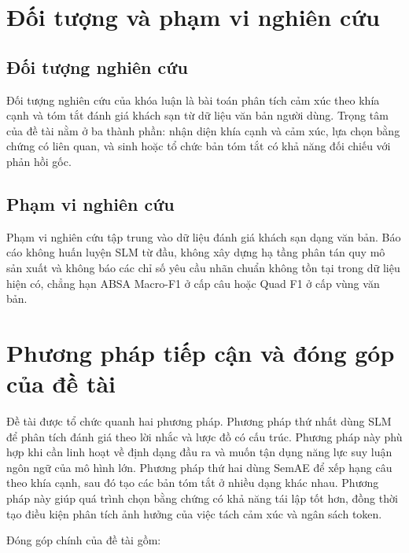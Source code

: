 \section{Đối tượng và phạm vi nghiên cứu}

\subsection{Đối tượng nghiên cứu}

Đối tượng nghiên cứu của khóa luận là bài toán phân tích cảm xúc theo khía cạnh và tóm tắt đánh giá khách sạn từ dữ liệu văn bản người dùng. Trọng tâm của đề tài nằm ở ba thành phần: nhận diện khía cạnh và cảm xúc, lựa chọn bằng chứng có liên quan, và sinh hoặc tổ chức bản tóm tắt có khả năng đối chiếu với phản hồi gốc.

\subsection{Phạm vi nghiên cứu}

Phạm vi nghiên cứu tập trung vào dữ liệu đánh giá khách sạn dạng văn bản. Báo cáo không huấn luyện SLM từ đầu, không xây dựng hạ tầng phân tán quy mô sản xuất và không báo các chỉ số yêu cầu nhãn chuẩn không tồn tại trong dữ liệu hiện có, chẳng hạn ABSA Macro-F1 ở cấp câu hoặc Quad F1 ở cấp vùng văn bản.

\section{Phương pháp tiếp cận và đóng góp của đề tài}

Đề tài được tổ chức quanh hai phương pháp. Phương pháp thứ nhất dùng SLM để phân tích đánh giá theo lời nhắc và lược đồ có cấu trúc. Phương pháp này phù hợp khi cần linh hoạt về định dạng đầu ra và muốn tận dụng năng lực suy luận ngôn ngữ của mô hình lớn. Phương pháp thứ hai dùng SemAE để xếp hạng câu theo khía cạnh, sau đó tạo các bản tóm tắt ở nhiều dạng khác nhau. Phương pháp này giúp quá trình chọn bằng chứng có khả năng tái lập tốt hơn, đồng thời tạo điều kiện phân tích ảnh hưởng của việc tách cảm xúc và ngân sách token.

Đóng góp chính của đề tài gồm:

